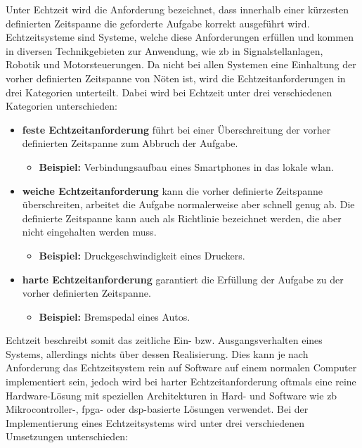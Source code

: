 \documentclass[../EDF Master Thesis.tex]{subfiles}
\begin{document}
    Unter Echtzeit wird die Anforderung bezeichnet, dass innerhalb einer kürzesten definierten Zeitspanne die geforderte Aufgabe korrekt ausgeführt wird.
    Echtzeitsysteme sind Systeme, welche diese Anforderungen erfüllen und kommen in diversen Technikgebieten zur Anwendung, wie \ac{zb} in Signalstellanlagen, Robotik und Motorsteuerungen.
    Da nicht bei allen Systemen eine Einhaltung der vorher definierten Zeitspanne von Nöten ist, wird die Echtzeitanforderungen in drei Kategorien unterteilt.
    Dabei wird bei Echtzeit unter drei verschiedenen Kategorien unterschieden:
    \begin{itemize}
        \item \textbf{feste Echtzeitanforderung} führt bei einer Überschreitung der vorher definierten Zeitspanne zum Abbruch der Aufgabe.
            \begin{itemize}
                \item \textbf{Beispiel:} Verbindungsaufbau eines Smartphones in das lokale \ac{wlan}.
            \end{itemize}
        \item \textbf{weiche Echtzeitanforderung} kann die vorher definierte Zeitspanne überschreiten, arbeitet die Aufgabe normalerweise aber schnell genug ab.
            Die definierte Zeitspanne kann auch als Richtlinie bezeichnet werden, die aber nicht eingehalten werden muss.
            \begin{itemize}
                \item \textbf{Beispiel:} Druckgeschwindigkeit eines Druckers.
            \end{itemize}
        \item \textbf{harte Echtzeitanforderung} garantiert die Erfüllung der Aufgabe zu der vorher definierten Zeitspanne.
        \begin{itemize}
            \item \textbf{Beispiel:} Bremspedal eines Autos.
        \end{itemize}
    \end{itemize}
    Echtzeit beschreibt somit das zeitliche Ein- bzw. Ausgangsverhalten eines Systems, allerdings nichts über dessen Realisierung.
    Dies kann je nach Anforderung das Echtzeitsystem rein auf Software auf einem normalen Computer implementiert sein, jedoch wird bei harter Echtzeitanforderung oftmals eine reine Hardware-Lösung mit speziellen Architekturen in Hard- und Software wie \ac{zb} Mikrocontroller-, \ac{fpga}- oder \ac{dsp}-basierte Lösungen verwendet. 
    Bei der Implementierung eines Echtzeitsystems wird unter drei verschiedenen Umsetzungen unterschieden:
\end{document}
